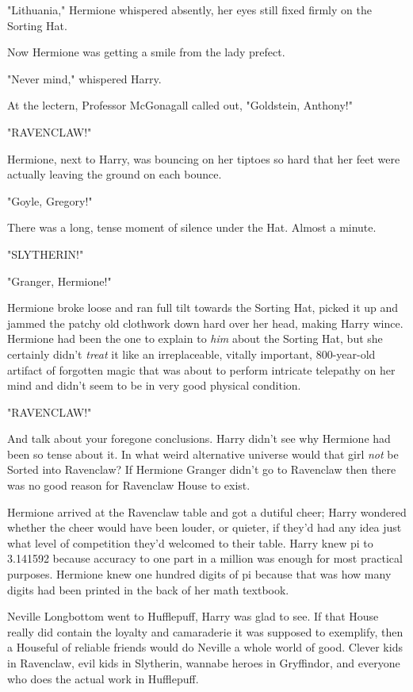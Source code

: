 "Lithuania," Hermione whispered absently, her eyes still fixed firmly on the
Sorting Hat.

Now Hermione was getting a smile from the lady prefect.

"Never mind," whispered Harry.

At the lectern, Professor McGonagall called out, "Goldstein, Anthony!"

"RAVENCLAW!"

Hermione, next to Harry, was bouncing on her tiptoes so hard that her feet were
actually leaving the ground on each bounce.

"Goyle, Gregory!"

There was a long, tense moment of silence under the Hat. Almost a minute.

"SLYTHERIN!"

"Granger, Hermione!"

Hermione broke loose and ran full tilt towards the Sorting Hat, picked it up
and jammed the patchy old clothwork down hard over her head, making Harry
wince. Hermione had been the one to explain to \emph{him} about the Sorting
Hat, but she certainly didn't \emph{treat} it like an irreplaceable, vitally
important, 800-year-old artifact of forgotten magic that was about to perform
intricate telepathy on her mind and didn't seem to be in very good physical
condition.

"RAVENCLAW!"

And talk about your foregone conclusions. Harry didn't see why Hermione had
been so tense about it. In what weird alternative universe would that girl
\emph{not} be Sorted into Ravenclaw? If Hermione Granger didn't go to Ravenclaw
then there was no good reason for Ravenclaw House to exist.

Hermione arrived at the Ravenclaw table and got a dutiful cheer; Harry wondered
whether the cheer would have been louder, or quieter, if they'd had any idea
just what level of competition they'd welcomed to their table. Harry knew pi to
3.141592 because accuracy to one part in a million was enough for most
practical purposes. Hermione knew one hundred digits of pi because that was how
many digits had been printed in the back of her math textbook.

Neville Longbottom went to Hufflepuff, Harry was glad to see. If that House
really did contain the loyalty and camaraderie it was supposed to exemplify,
then a Houseful of reliable friends would do Neville a whole world of good.
Clever kids in Ravenclaw, evil kids in Slytherin, wannabe heroes in Gryffindor,
and everyone who does the actual work in Hufflepuff.

